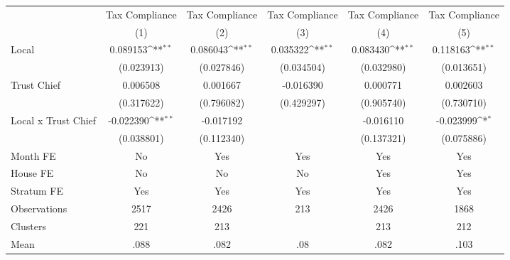 {
\def\sym#1{\ifmmode^{#1}\else\(^{#1}\)\fi}
\begin{tabular}{l*{5}{c}}
\toprule
                &\multicolumn{1}{c}{Tax Compliance}&\multicolumn{1}{c}{Tax Compliance}&\multicolumn{1}{c}{Tax Compliance}&\multicolumn{1}{c}{Tax Compliance}&\multicolumn{1}{c}{Tax Compliance}\\
                &\multicolumn{1}{c}{(1)}         &\multicolumn{1}{c}{(2)}         &\multicolumn{1}{c}{(3)}         &\multicolumn{1}{c}{(4)}         &\multicolumn{1}{c}{(5)}         \\
\midrule
Local           & 0.089153\sym{**} & 0.086043\sym{**} & 0.035322\sym{**} & 0.083430\sym{**} & 0.118163\sym{**} \\
                &(0.023913)         &(0.027846)         &(0.034504)         &(0.032980)         &(0.013651)         \\
Trust Chief     & 0.006508         & 0.001667         &-0.016390         & 0.000771         & 0.002603         \\
                &(0.317622)         &(0.796082)         &(0.429297)         &(0.905740)         &(0.730710)         \\
Local x Trust Chief&-0.022390\sym{**} &-0.017192         &                  &-0.016110         &-0.023999\sym{*}  \\
                &(0.038801)         &(0.112340)         &                  &(0.137321)         &(0.075886)         \\
Month FE        &       No         &      Yes         &      Yes         &      Yes         &      Yes         \\
House FE        &       No         &       No         &       No         &      Yes         &      Yes         \\
Stratum FE      &      Yes         &      Yes         &      Yes         &      Yes         &      Yes         \\
\midrule
Observations    &     2517         &     2426         &      213         &     2426         &     1868         \\
Clusters        &      221         &      213         &                  &      213         &      212         \\
Mean            &     .088         &     .082         &      .08         &     .082         &     .103         \\
\bottomrule
\end{tabular}
}
